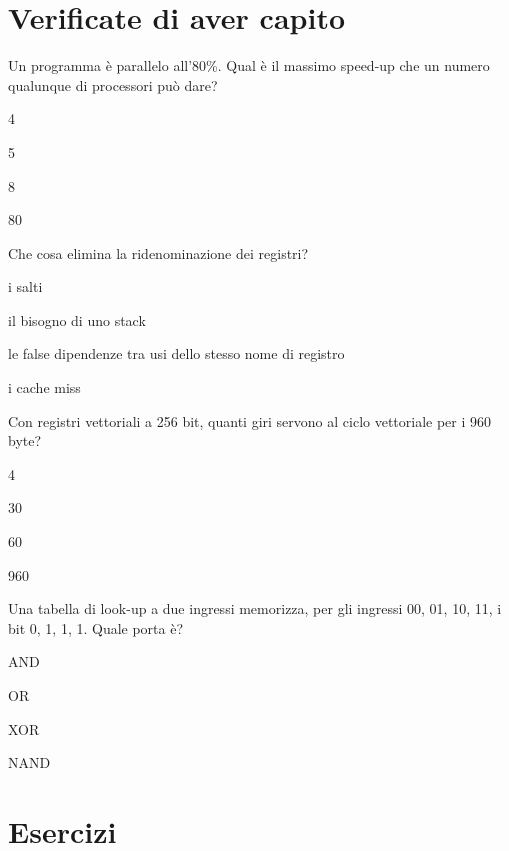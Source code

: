 \section{Verificate di aver capito}

\begin{quiz}{Un programma è parallelo all'80\%. Qual è il massimo speed-up che un numero qualunque di processori può dare?}
\item 4
\item 5
\item 8
\item 80
\end{quiz}

\begin{quiz}{Che cosa elimina la ridenominazione dei registri?}
\item i salti
\item il bisogno di uno stack
\item le false dipendenze tra usi dello stesso nome di registro
\item i cache miss
\end{quiz}

\begin{quiz}{Con registri vettoriali a 256 bit, quanti giri servono al ciclo vettoriale per i 960 byte?}
\item 4
\item 30
\item 60
\item 960
\end{quiz}

\begin{quiz}{Una tabella di look-up a due ingressi memorizza, per gli ingressi 00, 01, 10, 11, i bit 0, 1, 1, 1. Quale porta è?}
\item AND
\item OR
\item XOR
\item NAND
\end{quiz}

\section{Esercizi}

